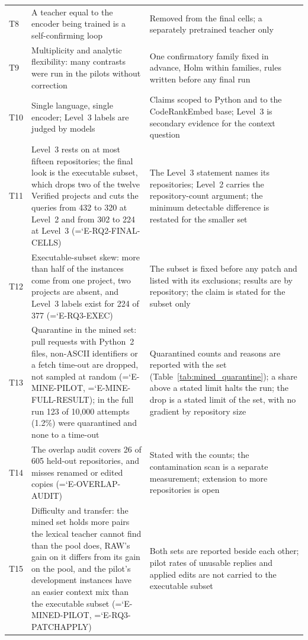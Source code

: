 \documentclass[10pt,twocolumn]{article}
\newcommand{\entry}[1]{{\ttfamily\hyphenchar\font=`\-\relax #1}}
\begin{document}
\begin{table}[t]
\begin{tabular}{@{}p{}p{}p{}@{}}
T8 & A teacher equal to the encoder being trained is a self-confirming loop & Removed from the final cells; a separately pretrained teacher only \\
T9 & Multiplicity and analytic flexibility: many contrasts were run in the pilots without correction & One confirmatory family fixed in advance, Holm within families, rules written before any final run \\
T10 & Single language, single encoder; Level~3 labels are judged by models & Claims scoped to Python and to the CodeRankEmbed base; Level~3 is secondary evidence for the context question \\
T11 & Level~3 rests on at most fifteen repositories; the final look is the executable subset, which drops two of the twelve Verified projects and cuts the queries from 432 to 320 at Level~2 and from 302 to 224 at Level~3 (\entry{E-RQ2-FINAL-CELLS}) & The Level~3 statement names its repositories; Level~2 carries the repository-count argument; the minimum detectable difference is restated for the smaller set \\
T12 & Executable-subset skew: more than half of the instances come from one project, two projects are absent, and Level~3 labels exist for 224 of 377 (\entry{E-RQ3-EXEC}) & The subset is fixed before any patch and listed with its exclusions; results are by repository; the claim is stated for the subset only \\
T13 & Quarantine in the mined set: pull requests with Python~2 files, non-ASCII identifiers or a fetch time-out are dropped, not sampled at random (\entry{E-MINE-PILOT}, \entry{E-MINE-FULL-RESULT}); in the full run 123 of 10,000 attempts (1.2\%) were quarantined and none to a time-out & Quarantined counts and reasons are reported with the set (Table~\ref{tab:mined_quarantine}); a share above a stated limit halts the run; the drop is a stated limit of the set, with no gradient by repository size \\ %
T14 & The overlap audit covers 26 of 605 held-out repositories, and misses renamed or edited copies (\entry{E-OVERLAP-AUDIT}) & Stated with the counts; the contamination scan is a separate measurement; extension to more repositories is open \\
T15 & Difficulty and transfer: the mined set holds more pairs the lexical teacher cannot find than the pool does, RAW's gain on it differs from its gain on the pool, and the pilot's development instances have an easier context mix than the executable subset (\entry{E-MINED-PILOT}, \entry{E-RQ3-PATCHAPPLY}) & Both sets are reported beside each other; pilot rates of unusable replies and applied edits are not carried to the executable subset \\

\end{tabular}
\end{table}
\end{document}
